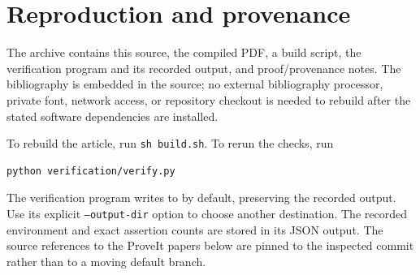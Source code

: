 \documentclass[11pt,a4paper]{article}
\numberwithin{equation}{section}
\theoremstyle{definition}
\theoremstyle{remark}\newtheorem{remark}[theorem]{Remark}
\begin{document}
\section{Reproduction and provenance}
The archive contains this source, the compiled PDF, a build script, the verification program and its recorded output, and proof/provenance notes. The bibliography is embedded in the source; no external bibliography processor, private font, network access, or repository checkout is needed to rebuild after the stated software dependencies are installed.

To rebuild the article, run \texttt{sh build.sh}. To rerun the checks, run
\begin{verbatim}
python verification/verify.py
\end{verbatim}
The verification program writes to  by default, preserving the recorded output. Use its explicit \texttt{--output-dir} option to choose another destination. The recorded environment and exact assertion counts are stored in its JSON output. The source references to the ProveIt papers below are pinned to the inspected commit rather than to a moving default branch.
\end{document}
